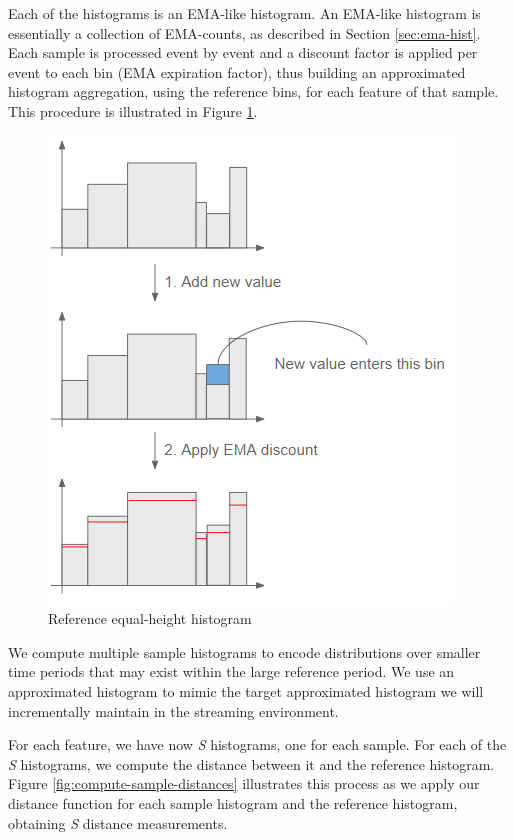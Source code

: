 Each of the histograms is an EMA-like histogram. An EMA-like histogram is essentially a collection of EMA-counts, as described in Section \ref{sec:ema-hist}. Each sample is processed event by event and a discount factor is applied per event to each bin (EMA expiration factor), thus building an approximated histogram aggregation, using the reference bins, for each feature of that sample. This procedure is illustrated in Figure \ref{fig:EMA-hist-build}.
\begin{figure}[!htb]
    \begin{center}
    \hspace{2cm}
      \includegraphics[scale=0.8]{figures/ema-hist.png}
      \caption[]{Reference equal-height histogram}
      \label{fig:EMA-hist-build}
    \end{center}
\end{figure}
We compute multiple sample histograms to encode distributions over smaller time periods that may exist within the large reference period. We use an approximated histogram to mimic the target approximated histogram we will incrementally maintain in the streaming environment.

For each feature, we have now \textit{S} histograms, one for each sample. For each of the \textit{S} histograms, we compute the distance between it and the reference histogram. Figure \ref{fig:compute-sample-distances} illustrates this process as we apply our distance function for each sample histogram and the reference histogram, obtaining \textit{S} distance measurements.

